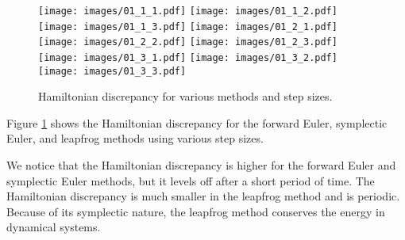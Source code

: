 \begin{solution}
\begin{enumerate}[(a)]
\begin{figure}[h!]
      \centering
      \texttt{[image: images/01\_1\_1.pdf]}
      \texttt{[image: images/01\_1\_2.pdf]}
      \texttt{[image: images/01\_1\_3.pdf]}
      \texttt{[image: images/01\_2\_1.pdf]}
      \texttt{[image: images/01\_2\_2.pdf]}
      \texttt{[image: images/01\_2\_3.pdf]}
      \texttt{[image: images/01\_3\_1.pdf]}
      \texttt{[image: images/01\_3\_2.pdf]}
      \texttt{[image: images/01\_3\_3.pdf]}
      \caption{Hamiltonian discrepancy for various methods and step sizes.}
      \label{F:01}
    \end{figure}
    Figure \ref{F:01} shows the Hamiltonian discrepancy for the forward Euler, symplectic Euler, and leapfrog methods using various step sizes. 
    
    We notice that the Hamiltonian discrepancy is higher for the forward Euler and symplectic Euler methods, but it levels off after a short period of time. The Hamiltonian discrepancy is much smaller in the leapfrog method and is periodic. Because of its symplectic nature, the leapfrog method conserves the energy in dynamical systems.
  \end{enumerate}
\end{solution}
